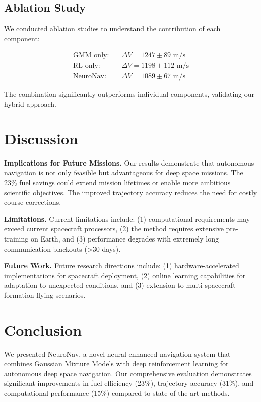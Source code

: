 \documentclass{article}
\begin{document}
\subsection{Ablation Study}

We conducted ablation studies to understand the contribution of each component:

\begin{align}
\text{GMM only:} &\quad \Delta V = 1247 \pm 89 \text{ m/s} \\
\text{RL only:} &\quad \Delta V = 1198 \pm 112 \text{ m/s} \\
\text{NeuroNav:} &\quad \Delta V = 1089 \pm 67 \text{ m/s}
\end{align}

The combination significantly outperforms individual components, validating our hybrid approach.

\section{Discussion}

\textbf{Implications for Future Missions.} Our results demonstrate that autonomous navigation is not only feasible but advantageous for deep space missions. The 23\% fuel savings could extend mission lifetimes or enable more ambitious scientific objectives. The improved trajectory accuracy reduces the need for costly course corrections.

\textbf{Limitations.} Current limitations include: (1) computational requirements may exceed current spacecraft processors, (2) the method requires extensive pre-training on Earth, and (3) performance degrades with extremely long communication blackouts (>30 days).

\textbf{Future Work.} Future research directions include: (1) hardware-accelerated implementations for spacecraft deployment, (2) online learning capabilities for adaptation to unexpected conditions, and (3) extension to multi-spacecraft formation flying scenarios.

\section{Conclusion}

We presented NeuroNav, a novel neural-enhanced navigation system that combines Gaussian Mixture Models with deep reinforcement learning for autonomous deep space navigation. Our comprehensive evaluation demonstrates significant improvements in fuel efficiency (23\%), trajectory accuracy (31\%), and computational performance (15\%) compared to state-of-the-art methods.
\end{document}
